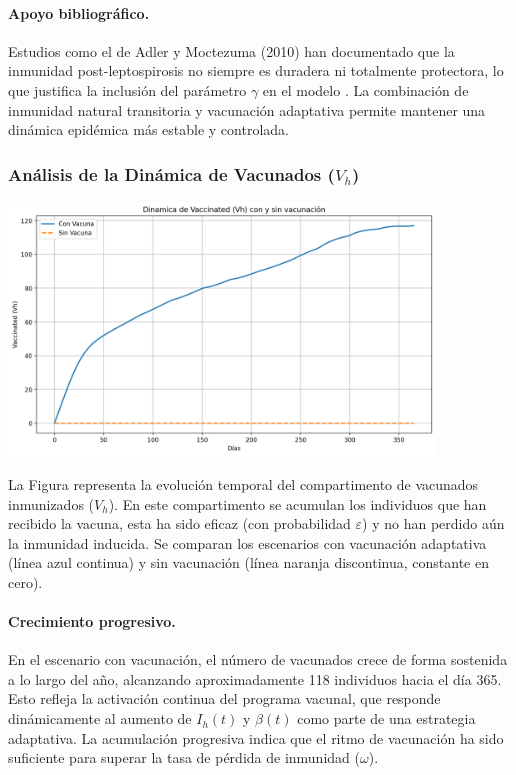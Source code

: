 \documentclass[12pt,a4paper]{article}
\begin{document}
\paragraph{Apoyo bibliográfico.} Estudios como el de Adler y Moctezuma (2010) han documentado que la inmunidad post-leptospirosis no siempre es duradera ni totalmente protectora, lo que justifica la inclusión del parámetro $\gamma$ en el modelo \cite{adler2010}. La combinación de inmunidad natural transitoria y vacunación adaptativa permite mantener una dinámica epidémica más estable y controlada.



\subsubsection{Análisis de la Dinámica de Vacunados (\texorpdfstring{$V_h$}{Vh})}

\includegraphics[width=0.85\textwidth]{Images/vacunados.png}


La Figura representa la evolución temporal del compartimento de vacunados inmunizados ($V_h$). En este compartimento se acumulan los individuos que han recibido la vacuna, esta ha sido eficaz (con probabilidad $\varepsilon$) y no han perdido aún la inmunidad inducida. Se comparan los escenarios con vacunación adaptativa (línea azul continua) y sin vacunación (línea naranja discontinua, constante en cero).

\paragraph{Crecimiento progresivo.} En el escenario con vacunación, el número de vacunados crece de forma sostenida a lo largo del año, alcanzando aproximadamente 118 individuos hacia el día 365. Esto refleja la activación continua del programa vacunal, que responde dinámicamente al aumento de $I_h(t)$ y $\beta(t)$ como parte de una estrategia adaptativa. La acumulación progresiva indica que el ritmo de vacunación ha sido suficiente para superar la tasa de pérdida de inmunidad ($\omega$).
\end{document}
